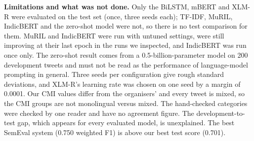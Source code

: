 \textbf{Limitations and what was not done.} Only the BiLSTM, mBERT and XLM-R were evaluated on the test set (once, three seeds each); TF-IDF, MuRIL, IndicBERT and the zero-shot model were not, so there is no test comparison for them. MuRIL and IndicBERT were run with untuned settings, were still improving at their last epoch in the
runs we inspected, and IndicBERT was run once only. The zero-shot result comes from a
0.5-billion-parameter model on 200 development tweets and must not be read as the performance of language-model prompting in
general. Three seeds per configuration give rough standard deviations, and XLM-R's learning rate was chosen on one seed by a
margin of 0.0001. Our CMI values differ from the organisers' and every tweet is mixed, so the CMI groups are not monolingual
versus mixed. The hand-checked categories were checked by one reader and have no agreement figure. The development-to-test gap, which appears for every evaluated model, is unexplained. The best SemEval system (0.750 weighted F1) is above our best test score (0.701).

